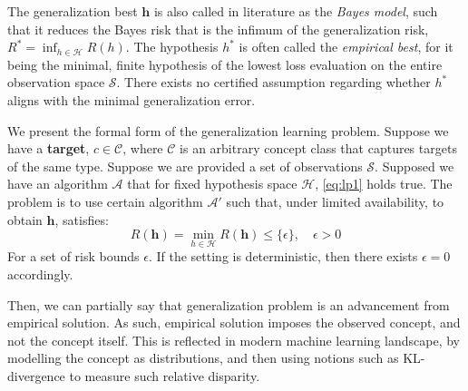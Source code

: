 \documentclass[10pt]{article} %
\begin{document}
The generalization best $\bm{h}$ is also called in literature as the \textit{Bayes model}, such that it reduces the Bayes risk that is the infimum of the generalization risk, $R^{*}=\inf_{h\in \mathcal{H}}R(h)$. The hypothesis $h^{*}$ is often called the \textit{empirical best}, for it being the minimal, finite hypothesis of the lowest loss evaluation on the entire observation space $\mathcal{S}$. There exists no certified assumption regarding whether $h^{*}$ aligns with the minimal generalization error.

\begin{definition}
    We present the formal form of the generalization learning problem. Suppose we have a \textbf{target}, $c\in\mathcal{C}$, where $\mathcal{C}$ is an arbitrary concept class that captures targets of the same type. Suppose we are provided a set of observations $\mathcal{S}$. Supposed we have an algorithm $\mathcal{A}$ that for fixed hypothesis space $\mathcal{H}$, \eqref{eq:lp1} holds true. The problem is to use certain algorithm $\mathcal{A}'$ such that, under limited availability, to obtain $\bm{h}$, satisfies: \begin{equation}
        R(\bm{h}) = \min_{h\in \mathcal{H}} R(\bm{h}) \leq \{\epsilon\}, \quad \epsilon > 0 
    \end{equation}
    For a set of risk bounds $\epsilon$. If the setting is deterministic, then there exists $\epsilon=0$ accordingly. 
\end{definition}

Then, we can partially say that generalization problem is an advancement from empirical solution. As such, empirical solution imposes the observed concept, and not the concept itself. This is reflected in modern machine learning landscape, by modelling the concept as distributions, and then using notions such as KL-divergence to measure such relative disparity. 
\end{document}
